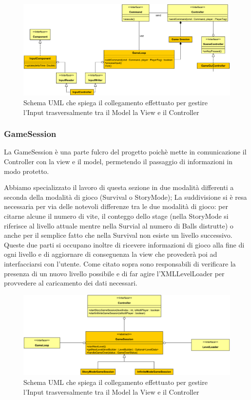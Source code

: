 \documentclass[a4paper,12pt]{report}
\begin{document}
\begin{figure}[H]
\includegraphics[width=\linewidth]{img/input}
\caption{Schema UML che spiega il collegamento effettuato per gestire l'Input trasversalmente tra il Model la View e il Controller}
\label{img:decorator}
\end{figure}

\subsubsection*{GameSession}

La GameSession è una parte fulcro del progetto poichè mette in comunicazione il Controller con la view e il model, permetendo il passaggio di informazioni in modo protetto.

Abbiamo specializzato il lavoro di questa sezione in due modalità differenti a seconda della modalità di gioco (Survival o StoryMode); 
La suddivisione si è resa necessaria per via delle notevoli differenze tra le due modalità di gioco: per citarne alcune il numero di vite, il conteggo dello stage (nella StoryMode si riferisce al livello attuale mentre nella Survial al numero di Balls distrutte) o anche per il semplice fatto che nella Survival non esiste un livello successivo.
Queste due parti si occupano inoltre di ricevere informazioni di gioco alla fine di ogni livello e di aggiornare di conseguenza la view che provederà poi ad interfacciarsi con l'utente.
Come citato sopra sono responsabili di verificare la presenza di un nuovo livello possibile e di far agire l'XMLLevelLoader per provvedere al caricamento dei dati necessari.

\begin{figure}[H]
\includegraphics[width=\linewidth]{img/gamesession}
\caption{Schema UML che spiega il collegamento effettuato per gestire l'Input trasversalmente tra il Model la View e il Controller}
\label{img:decorator}
\end{figure}
\end{document}

